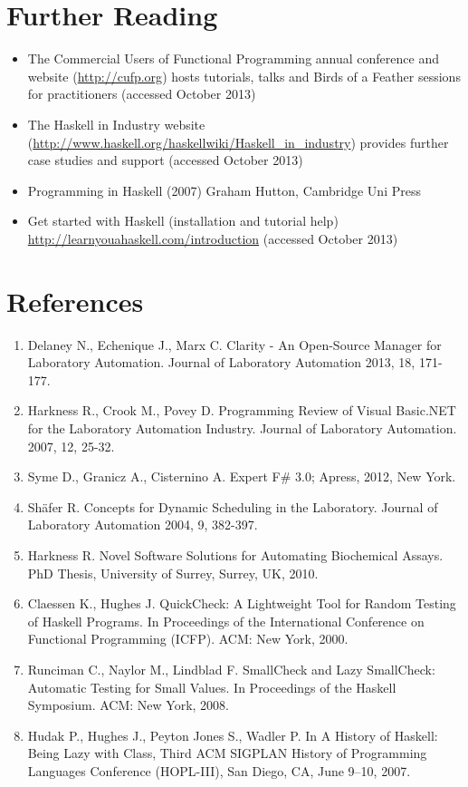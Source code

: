 \documentclass{article}
\begin{document}
\section{Further Reading}

\begin{itemize}

\item The Commercial Users of Functional Programming annual conference and website (\url{http://cufp.org}) hosts tutorials, talks and Birds of a Feather sessions for practitioners (accessed October 2013)
\item The Haskell in Industry website (\url{http://www.haskell.org/haskellwiki/Haskell_in_industry}) provides further case studies and support (accessed October 2013)
\item Programming in Haskell (2007) Graham Hutton, Cambridge Uni Press
\item Get started with Haskell (installation and tutorial help) \url{http://learnyouahaskell.com/introduction} (accessed October 2013)

\end{itemize}

\section{References}

\begin{enumerate}

\item Delaney N., Echenique J., Marx C. Clarity - An Open-Source Manager for Laboratory Automation. Journal of Laboratory Automation 2013, 18, 171-177.
\item Harkness R., Crook M., Povey D. Programming Review of Visual Basic.NET for the Laboratory Automation Industry. Journal of Laboratory Automation. 2007, 12, 25-32. 
\item Syme D., Granicz A., Cisternino A. Expert F\# 3.0; Apress, 2012, New York.
\item Shäfer R. Concepts for Dynamic Scheduling in the Laboratory. Journal of Laboratory Automation 2004, 9, 382-397.
\item Harkness R. Novel Software Solutions for Automating Biochemical Assays. PhD Thesis, University of Surrey, Surrey, UK, 2010.
\item Claessen K., Hughes J. QuickCheck: A Lightweight Tool for Random Testing of Haskell Programs. In Proceedings of the International Conference on Functional Programming (ICFP). ACM: New York, 2000. 
\item Runciman C., Naylor M., Lindblad F. SmallCheck and Lazy SmallCheck: Automatic Testing for Small Values. In Proceedings of the Haskell Symposium. ACM: New York, 2008.
\item Hudak P., Hughes J., Peyton Jones S., Wadler P. In A History of Haskell: Being Lazy with Class, Third ACM SIGPLAN History of Programming Languages Conference (HOPL-III), San Diego, CA, June 9–10, 2007. 

\end{enumerate}
\end{document}
